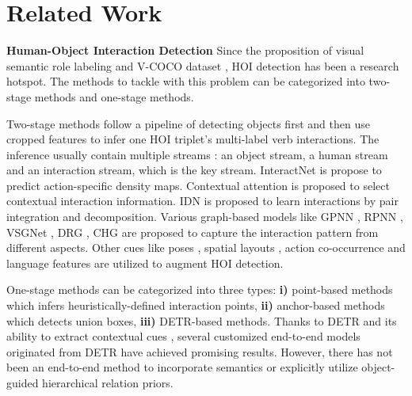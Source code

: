 \documentclass[letterpaper]{article} \usepackage{aaai22}  \usepackage{times}  \usepackage{helvet}  \usepackage{courier}  \usepackage[hyphens]{url}  \usepackage{graphicx} \urlstyle{rm} \def\UrlFont{\rm}  \usepackage{natbib}  \usepackage{caption} \DeclareCaptionStyle{ruled}{labelfont=normalfont,labelsep=colon,strut=off} \frenchspacing  \setlength{\pdfpagewidth}{8.5in}  \setlength{\pdfpageheight}{11in}  \usepackage{algorithm}
\begin{document}
\section{Related Work}


\noindent\textbf{Human-Object Interaction Detection} Since the proposition of visual semantic role labeling and V-COCO dataset \cite{gupta2015VisualSemanticRole}, HOI detection has been a research hotspot. The methods to tackle with this problem can be categorized into two-stage methods and one-stage methods. 

Two-stage methods follow a pipeline of detecting objects first and then use cropped features to infer one HOI triplet's multi-label verb interactions. The inference usually contain multiple streams \cite{chao2018learningtodetectHOI}: an object stream, a human stream and an interaction stream, which is the key stream. InteractNet \cite{kaiming18DetectHOI} is propose to predict action-specific density maps. Contextual attention \cite{wang2019deepcontextual} is proposed to select contextual interaction information. IDN \cite{li2020hoianalysis} is proposed to learn interactions by pair integration and decomposition. Various graph-based models like GPNN \cite{Qi2018GPNN}, RPNN \cite{Zhou2019RPNN}, VSGNet \cite{ulutan2020VSGNet}, DRG \cite{gao2020DRG}, CHG \cite{wang2020CHG} are proposed to capture the interaction pattern from different aspects. Other cues like poses \cite{gupta2019nofrills,li2019interactiveness}, spatial layouts \cite{gao2018ican}, action co-occurrence \cite{kim2020actioncooccur} and language features \cite{liu2020FCMFNet,xu2019HOIwithknowledge,peyre2019HOIwithanalogy,zhong2020polysemy} are utilized to augment HOI detection.




One-stage methods can be categorized into three types: \textbf{i)} point-based methods \cite{liao2020ppdm,zhong2021GGNet} which infers heuristically-defined interaction points, \textbf{ii)} anchor-based methods \cite{kim2020uniondet} which detects union boxes, \textbf{iii)} DETR-based \cite{carion2020DETR} methods. Thanks to DETR and its ability to extract contextual cues \cite{AttentionAlluNeed}, several customized end-to-end models \cite{kim2021hotr,zou2021HOITransformer,chen2021ASNet,tamura2021qpic} originated from DETR have achieved promising results. However, there has not been an end-to-end method to incorporate semantics or explicitly utilize object-guided 
hierarchical relation priors.
\end{document}
